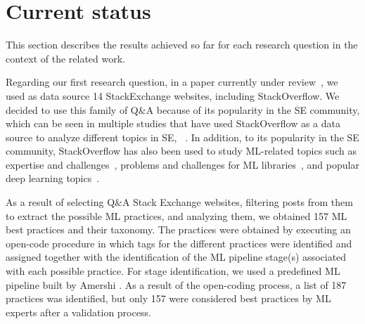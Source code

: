 \section{Current status}  
\label{sec:contr}

This section describes the results achieved so far for each research question in the context of the related work.


Regarding our first research question, in a paper currently under review~\cite{mojicapp}, we used as data source 14 StackExchange websites, including StackOverflow. We decided to use this family of Q\&A because of its popularity in the SE community, which can be seen in multiple studies that have used StackOverflow as a data source to analyze different topics in SE, \eg~\cite{zhang2021study, mondal2023automatic, chatterjee2020finding}. In addition, to its popularity in the SE community, StackOverflow has also been used to study ML-related topics such as expertise and challenges~\cite{Alshangiti_2019}, problems and challenges for ML libraries~\cite{Islam_2019}, and popular deep learning topics~\cite{Han_2020}.



As a result of selecting Q\&A Stack Exchange websites, filtering posts from them to extract the possible ML practices, and analyzing them, we obtained 157 ML best practices and their taxonomy.  The practices were obtained by executing an open-code procedure in which tags for the different practices were identified and assigned together with the identification of the ML pipeline stage(s) associated with each possible practice. For  stage identification, we used a predefined ML pipeline built by Amershi \etal \cite{amershi2019software}. As a result of the open-coding process, a list of 187 practices was identified, but only 157 were considered  best practices by ML experts after a validation process. 

